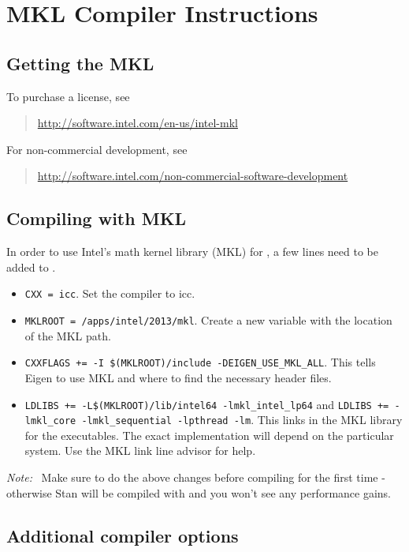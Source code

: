 \section{MKL Compiler Instructions}

\subsection{Getting the MKL}

To purchase a license, see
%
\begin{quote}
\url{http://software.intel.com/en-us/intel-mkl}
\end{quote}
%
For non-commercial development, see
%
\begin{quote}\small
\url{http://software.intel.com/non-commercial-software-development}
\end{quote}

\subsection{Compiling with MKL}

In order to use Intel's math kernel library (MKL) for \Cpp, a few
lines need to be added to .
\begin{itemize}
  \item \Verb|CXX = icc|. Set the compiler to icc.
  \item \Verb|MKLROOT = /apps/intel/2013/mkl|. Create a new variable
    with the location of the MKL path.
  \item
    \Verb|CXXFLAGS += -I $(MKLROOT)/include -DEIGEN_USE_MKL_ALL|. This
    tells Eigen to use MKL and where to find the necessary header
    files.
  \item \Verb|LDLIBS += -L$(MKLROOT)/lib/intel64 -lmkl_intel_lp64| and
    \Verb|LDLIBS += -lmkl_core -lmkl_sequential -lpthread -lm|. This
    links in the MKL library for the \CmdStan executables. The exact
    implementation will depend on the particular system. Use the MKL
    link line advisor for help.
\end{itemize}
%
{\it Note:} \ Make sure to do the above changes before compiling for the first
time - otherwise Stan will be compiled with  and you won't see any
performance gains.

\subsection{Additional compiler options}

